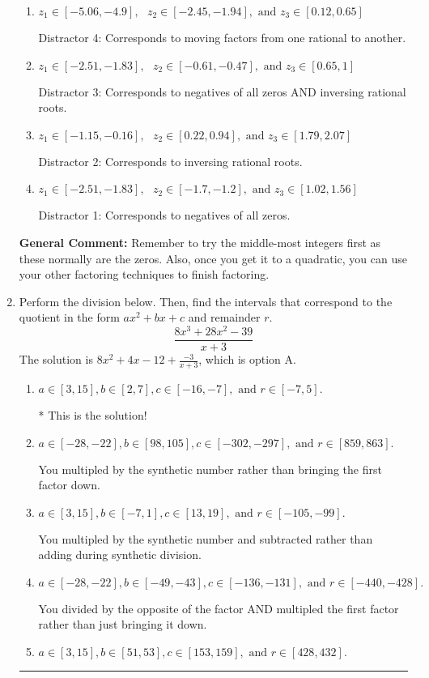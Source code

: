 \documentclass{extbook}[14pt]
\newcommand{\litem}[1]{\item #1

\rule{\textwidth}{0.4pt}}
\begin{document}
\begin{enumerate}
{\begin{enumerate}[label=\Alph*.]
* This is the solution!
\item \( z_1 \in [-5.06, -4.9], \text{   }  z_2 \in [-2.45, -1.94], \text{   and   } z_3 \in [0.12, 0.65] \)

 Distractor 4: Corresponds to moving factors from one rational to another.
\item \( z_1 \in [-2.51, -1.83], \text{   }  z_2 \in [-0.61, -0.47], \text{   and   } z_3 \in [0.65, 1] \)

 Distractor 3: Corresponds to negatives of all zeros AND inversing rational roots.
\item \( z_1 \in [-1.15, -0.16], \text{   }  z_2 \in [0.22, 0.94], \text{   and   } z_3 \in [1.79, 2.07] \)

 Distractor 2: Corresponds to inversing rational roots.
\item \( z_1 \in [-2.51, -1.83], \text{   }  z_2 \in [-1.7, -1.2], \text{   and   } z_3 \in [1.02, 1.56] \)

 Distractor 1: Corresponds to negatives of all zeros.
\end{enumerate}

\textbf{General Comment:} Remember to try the middle-most integers first as these normally are the zeros. Also, once you get it to a quadratic, you can use your other factoring techniques to finish factoring.
}
\litem{
Perform the division below. Then, find the intervals that correspond to the quotient in the form $ax^2+bx+c$ and remainder $r$.
\[ \frac{8x^{3} +28 x^{2} -39}{x + 3} \]The solution is \( 8x^{2} +4 x -12 + \frac{-3}{x + 3} \), which is option A.\begin{enumerate}[label=\Alph*.]
\item \( a \in [3, 15], b \in [2, 7], c \in [-16, -7], \text{ and } r \in [-7, 5]. \)

* This is the solution!
\item \( a \in [-28, -22], b \in [98, 105], c \in [-302, -297], \text{ and } r \in [859, 863]. \)

 You multipled by the synthetic number rather than bringing the first factor down.
\item \( a \in [3, 15], b \in [-7, 1], c \in [13, 19], \text{ and } r \in [-105, -99]. \)

 You multipled by the synthetic number and subtracted rather than adding during synthetic division.
\item \( a \in [-28, -22], b \in [-49, -43], c \in [-136, -131], \text{ and } r \in [-440, -428]. \)

 You divided by the opposite of the factor AND multipled the first factor rather than just bringing it down.
\item \( a \in [3, 15], b \in [51, 53], c \in [153, 159], \text{ and } r \in [428, 432]. \)


\end{enumerate}}
\end{enumerate}
\end{document}
